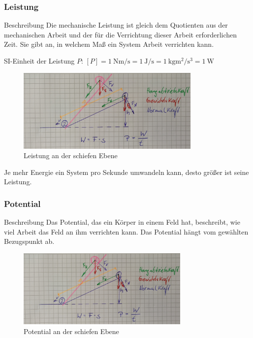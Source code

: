 \documentclass[12pt,oneside]{scrartcl}
\begin{document}
\frame
{
  \frametitle{Leistung}
\begin{block}{Beschreibung}
Die mechanische Leistung ist gleich dem Quotienten aus der mechanischen Arbeit und der für die Verrichtung dieser Arbeit erforderlichen Zeit. Sie gibt an, in welchem Maß ein System Arbeit verrichten kann.
\end{block}
SI-Einheit der Leistung $P$:
$[P]=\SI{1}{\newton\meter\per\second}=\SI{1}{\joule\per\second}=\SI{1}{\kilo\gram\square\meter\per\cubic\second}=\SI{1}{\watt}$
      \begin{figure}
	  \includegraphics[width=0.8\textwidth]{Leistung}
	  \vspace{-3mm}
	  \caption{Leistung an der schiefen Ebene}
   \end{figure}
   Je mehr Energie ein System pro Sekunde umwandeln kann, desto größer ist seine Leistung.
}

\frame
{
  \frametitle{Potential}
\begin{block}{Beschreibung}
Das Potential, das ein Körper in einem Feld hat, beschreibt, wie viel Arbeit das Feld an ihm verrichten kann. Das Potential hängt vom gewählten Bezugspunkt ab.
\end{block}
      \begin{figure}
	  \includegraphics[width=0.75\textwidth]{Leistung}
	  \vspace{-3mm}
	  \caption{Potential an der schiefen Ebene}
   \end{figure}
}
\end{document}
